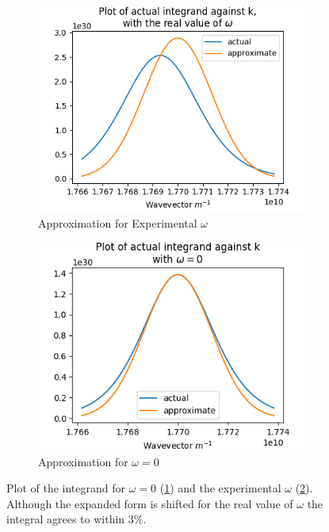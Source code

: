 \begin{figure}[htbp]
    \centering
    \begin{subfigure}{0.45\linewidth}
        \centering
        \includegraphics[width =0.9 \linewidth]{Figures/Redfield/real omega fermi k expansion.png}
        \caption{Approximation for Experimental \(\omega \)
        }\label{sub@fig:omega zero expansion}
    \end{subfigure}
    \begin{subfigure}{0.45\linewidth}
        \centering
        \includegraphics[width = 0.9\linewidth]{Figures/Redfield/zero omega fermi k expansion.png}
        \caption{Approximation for \(\omega = 0\)
        }\label{sub@fig:omega not zero expansion}
    \end{subfigure}
    \caption{
        Plot of the integrand for \(\omega = 0\)
        (\cref{sub@fig:omega zero expansion})
        and the experimental \(\omega \)
        (\cref{sub@fig:omega not zero expansion}).
        Although the expanded form is shifted for the
        real value of \(\omega \)
        the integral agrees
        to within \(3\% \).
    }\label{fig:expansion about kf}
\end{figure}
